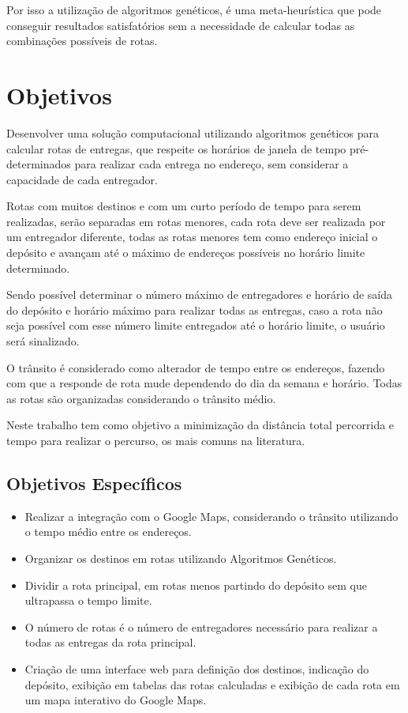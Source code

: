 Por isso a utilização de algoritmos genéticos, é uma meta-heurística que pode conseguir resultados satisfatórios sem a necessidade de calcular todas as combinações  possíveis de rotas.


\section{Objetivos}

Desenvolver uma solução computacional utilizando algoritmos genéticos para calcular rotas de entregas, que respeite os horários de janela de tempo pré-determinados para realizar cada entrega no endereço, sem considerar a capacidade de cada entregador.

Rotas com muitos destinos e com um curto período de tempo para serem realizadas, serão separadas em rotas menores, cada rota deve ser realizada por um entregador diferente, todas as rotas menores tem como endereço inicial o depósito e avançam até o máximo de endereços possíveis no horário limite determinado. 

Sendo possível determinar o número máximo de entregadores e horário de saída do depósito e horário máximo para realizar todas as entregas, caso a rota não seja possível com esse número limite entregados até o horário limite, o usuário será sinalizado.

O trânsito é considerado como alterador de tempo entre os endereços, fazendo com que a responde de rota mude dependendo do dia da semana e horário. Todas as rotas são organizadas considerando o trânsito médio.

Neste trabalho tem como objetivo a minimização da distância total percorrida e tempo para realizar o percurso, os mais comuns na literatura.


\subsection{Objetivos Específicos}

\begin{itemize}
	\item Realizar a integração com o Google Maps, considerando o trânsito utilizando o tempo médio entre os endereços.
	\item Organizar os destinos em rotas utilizando Algoritmos Genéticos.
	\item Dividir a rota principal, em rotas menos partindo do depósito sem que ultrapassa o tempo limite.
	\item O número de rotas é o número de entregadores necessário para realizar a todas as entregas da rota principal. 
	\item Criação de uma interface web para definição dos destinos, indicação do depósito, exibição em tabelas das rotas calculadas e exibição de cada rota em um mapa interativo do Google Maps.
\end{itemize}


